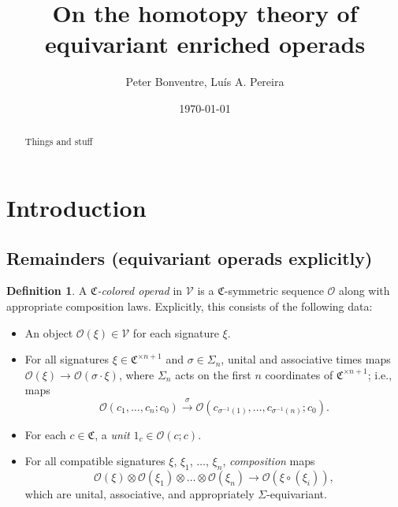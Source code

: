 \documentclass[a4paper,10pt
,draft
]{article}%
\title{On the homotopy theory of equivariant enriched operads}
\author{Peter Bonventre, Lu\'is A. Pereira}%
\date{\today}
\numberwithin{equation}{section}
\numberwithin{figure}{section}
\theoremstyle{definition} %
\newtheorem{definition}[equation]{Definition}%
\newcommand{\V}{\ensuremath{\mathcal V}}
\renewcommand{\O}{\ensuremath{\mathcal O}}
\newcommand{\ksi}{\xi}
\newcommand{\1}{\ensuremath{\mathbbm 1}}%
\begin{document}
\maketitle

\begin{abstract}
      Things and stuff
\end{abstract}

\tableofcontents







\section{Introduction}


\subsection{Remainders (equivariant operads explicitly)}

\begin{definition}
      A \textit{$\mathfrak C$-colored operad} in $\V$ 
      is a $\mathfrak C$-symmetric sequence $\O$ along with appropriate composition laws.
      Explicitly, this consists of the following data:
      \begin{itemize} %
      \item An object $\O(\ksi) \in \V$ for each signature $\ksi$.
      \item For all signatures $\ksi \in \mathfrak C^{\times n+1}$ and $\sigma \in \Sigma_n$,
            unital and associative times maps $\O(\xi) \to \O(\sigma \cdot \xi)$,
            where $\Sigma_n$ acts on the first $n$ coordinates of $\mathfrak C^{\times n+1}$;
            i.e., maps
            \begin{equation}
                  \O(c_1, \ldots, c_n; c_0) \xrightarrow{\sigma} \O(c_{\sigma^{-1}(1)}, \ldots, c_{\sigma^{-1}(n)}; c_0).
            \end{equation}
      \item For each $c \in \mathfrak C$, a \textit{unit} $1_c \in \O(c;c)$.                        
      \item For all compatible signatures $\ksi$, $\ksi_1$, $\dots$, $\ksi_n$,
            \textit{composition} maps
            \begin{equation}
                  \O(\xi) \otimes \O(\xi_1) \otimes \ldots \otimes \O(\xi_n) \to \O(\xi \circ (\xi_i)),
            \end{equation}
            which are unital, associative, and appropriately $\Sigma$-equivariant.
      \end{itemize}
\end{definition}
\end{document}
